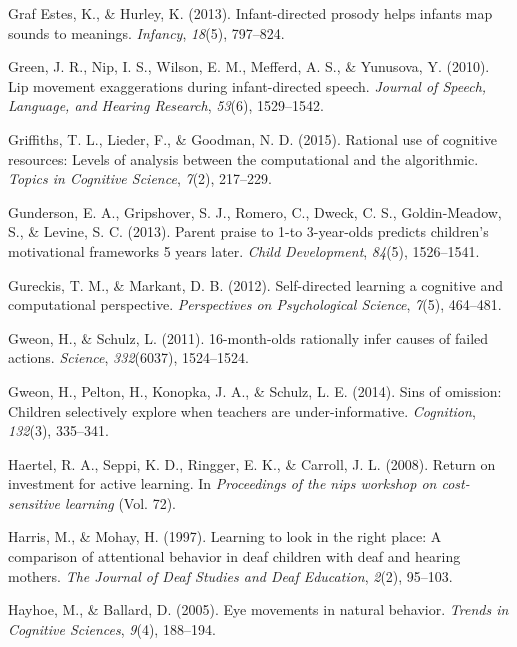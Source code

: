 \documentclass[oneside]{report}
\begin{document}
\hypertarget{ref-graf2013infant}{}
Graf Estes, K., \& Hurley, K. (2013). Infant-directed prosody helps
infants map sounds to meanings. \emph{Infancy}, \emph{18}(5), 797--824.

\hypertarget{ref-green2010lip}{}
Green, J. R., Nip, I. S., Wilson, E. M., Mefferd, A. S., \& Yunusova, Y.
(2010). Lip movement exaggerations during infant-directed speech.
\emph{Journal of Speech, Language, and Hearing Research}, \emph{53}(6),
1529--1542.

\hypertarget{ref-griffiths2015rational}{}
Griffiths, T. L., Lieder, F., \& Goodman, N. D. (2015). Rational use of
cognitive resources: Levels of analysis between the computational and
the algorithmic. \emph{Topics in Cognitive Science}, \emph{7}(2),
217--229.

\hypertarget{ref-gunderson2013parent}{}
Gunderson, E. A., Gripshover, S. J., Romero, C., Dweck, C. S.,
Goldin-Meadow, S., \& Levine, S. C. (2013). Parent praise to 1-to
3-year-olds predicts children's motivational frameworks 5 years later.
\emph{Child Development}, \emph{84}(5), 1526--1541.

\hypertarget{ref-gureckis2012self}{}
Gureckis, T. M., \& Markant, D. B. (2012). Self-directed learning a
cognitive and computational perspective. \emph{Perspectives on
Psychological Science}, \emph{7}(5), 464--481.

\hypertarget{ref-gweon201116}{}
Gweon, H., \& Schulz, L. (2011). 16-month-olds rationally infer causes
of failed actions. \emph{Science}, \emph{332}(6037), 1524--1524.

\hypertarget{ref-gweon2014sins}{}
Gweon, H., Pelton, H., Konopka, J. A., \& Schulz, L. E. (2014). Sins of
omission: Children selectively explore when teachers are
under-informative. \emph{Cognition}, \emph{132}(3), 335--341.

\hypertarget{ref-haertel2008return}{}
Haertel, R. A., Seppi, K. D., Ringger, E. K., \& Carroll, J. L. (2008).
Return on investment for active learning. In \emph{Proceedings of the
nips workshop on cost-sensitive learning} (Vol. 72).

\hypertarget{ref-harris1997learning}{}
Harris, M., \& Mohay, H. (1997). Learning to look in the right place: A
comparison of attentional behavior in deaf children with deaf and
hearing mothers. \emph{The Journal of Deaf Studies and Deaf Education},
\emph{2}(2), 95--103.

\hypertarget{ref-hayhoe2005eye}{}
Hayhoe, M., \& Ballard, D. (2005). Eye movements in natural behavior.
\emph{Trends in Cognitive Sciences}, \emph{9}(4), 188--194.
\end{document}
